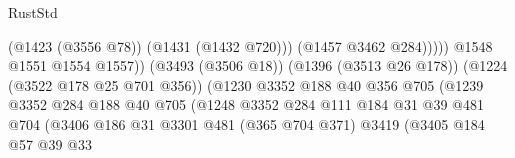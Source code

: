 \begin{lexlean}{RustStd}
\begin{coremodule}
{\begin{coremodule}
{{{{{{{{{                                                              (@1423 (@3556 @78))
                                                              (@1431 (@1432 @720)))
                                                            (@1457 @3462 @284)))))
                                                    @1548
                                                    @1551
                                                    @1554
                                                    @1557))
                                                (@3493 (@3506 @18))
                                                (@1396 (@3513 @26 @178))
                                                (@1224 (@3522 @178 @25 @701 @356))
                                                (@1230
                                                  @3352
                                                  @188
                                                  @40
                                                  @356
                                                  @705
                                                  (@1239
                                                    @3352
                                                    @284
                                                    @188
                                                    @40
                                                    @705
                                                    (@1248
                                                      @3352
                                                      @284
                                                      @111
                                                      @184
                                                      @31
                                                      @39
                                                      @481
                                                      @704
                                                      (@3406
                                                        @186
                                                        @31
                                                        @3301
                                                        @481
                                                        (@365 @704 @371)
                                                        @3419
                                                        (@3405
                                                          @184
                                                          @57
                                                          @39
                                                          @33
}}}}}}}}}
\end{coremodule}}
\end{coremodule}
\end{lexlean}
